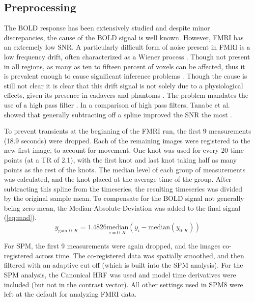 \documentclass[journal]{./IEEEtran}
\begin{document}
\subsection{Preprocessing}
The BOLD response has been
extensively studied and despite minor discrepancies, the cause of the BOLD
signal is well known. However, FMRI has an extremely low SNR. 
A particularly difficult form of noise present 
in FMRI is a low frequency
drift, often characterized as a Wiener process \cite{Riera2004}.
Though not present in all regions, as many as ten to fifteen percent
of voxels can be affected, thus it is prevalent 
enough to cause significant inference problems \cite{Tanabe2002, Smith2007}. 
Though the cause is still not
clear it is clear that this drift signal is not solely
due to a physiological effects, given its presence in cadavers and phantoms
\cite{Smith1999}. The problem mandates the use of a high pass 
filter \cite{Smith2007}.  In a comparison of high pass filters,
Tanabe et al.  showed that generally subtracting off
a spline improved the SNR the most \cite{Tanabe2002}.

To prevent transients at the beginning of the FMRI run, the first 9
measurements (18.9 seconds) were dropped. Each of the remaining 
images were registered to the new first image, to account for
movement. 
One knot was used for every 20 time points (at a TR of 2.1), with the first
knot and last knot taking half as many points as the rest of the knots.
The median level of each group of measurements was calculated, and the
knot placed at the average time of the group. After subtracting this spline
from the timeseries, the resulting timeseries was divided by the original
sample mean. To compensate for the BOLD signal not generally being zero-mean,
the Median-Absolute-Deviation was added to the final signal (\autoref{eq:mad}). 
\begin{equation}
y_{\text{gain}, 0:K} = 1.4826\underset{i=0:K}{\text{median}}(y_i - 
        \text{median}(y_{0:K}))
\label{eq:mad}
\end{equation}

For SPM, the first 9 measurements were again dropped, and the images
co-registered across time. The co-registered data was spatially smoothed,
and then filtered with an adaptive cut off (which is built into the
SPM analysis). For the SPM analysis, the Canonical HRF was used
and model time derivatives were included (but not in the contrast
vector). All other settings used in SPM8 were left at the default
for analyzing FMRI data.
\end{document}
